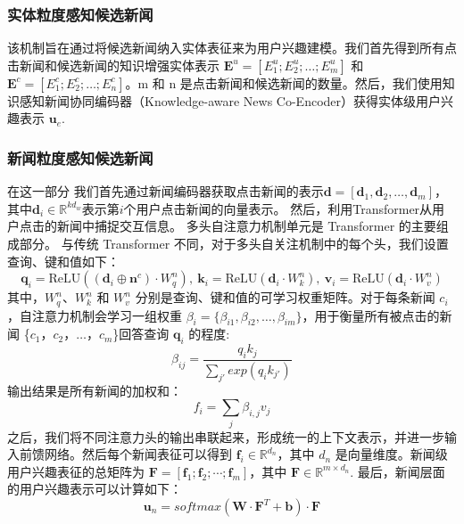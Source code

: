 \documentclass[withoutpreface,bwprint]{cumcmthesis} %
\begin{document}
	\subsubsection{ 实体粒度感知候选新闻}
	该机制旨在通过将候选新闻纳入实体表征来为用户兴趣建模。我们首先得到所有点击新闻和候选新闻的知识增强实体表示 $\mathbf{E}^{u} = [E^u_1;E^u_2;\dots;E^u_m] $ 和 $\mathbf{E}^{c} = [E^c_1;E^c_2;\dots;E^c_n] $。m 和 n 是点击新闻和候选新闻的数量。然后，我们使用知识感知新闻协同编码器（Knowledge-aware News Co-Encoder）获得实体级用户兴趣表示 $\mathbf{u}_e $.
	\subsubsection{ 新闻粒度感知候选新闻}
	在这一部分 
	我们首先通过新闻编码器获取点击新闻的表示$\mathbf{d}=[\mathbf{d}_1, \mathbf{d}_2,\dots,\mathbf{d}_m]$，其中$\mathbf{d}_i \in \mathbb{R}^{kd_w}$表示第$i$个用户点击新闻的向量表示。
	然后，利用Transformer从用户点击的新闻中捕捉交互信息。
	多头自注意力机制单元是 Transformer 的主要组成部分。
	与传统 Transformer 不同，对于多头自关注机制中的每个头，我们设置查询、键和值如下：
	\begin{equation}\label{eatt}
	\mathbf{q}_{i} = \mathrm{ReLU}((\mathbf{d}_i \oplus \mathbf{n}^c) \cdot W^n_q),~ \mathbf{k}_{i} = \mathrm{ReLU}(\mathbf{d}_i \cdot W^n_k),~
	\mathbf{v}_{i} = \mathrm{ReLU}(\mathbf{d}_i \cdot W^n_v)
	\end{equation}
	其中，$W^n_q$、$W^n_k$ 和 $W^n_v$ 分别是查询、键和值的可学习权重矩阵。对于每条新闻 $c_i$，自注意力机制会学习一组权重 $\beta_i = \{\beta_{i1}, \beta_{i2}, \dots, \beta_{im}\}$，用于衡量所有被点击的新闻 \{$c_1$，$c_2$，$\dots$，$c_m$\}回答查询 $\mathbf{q}_i$ 的程度:
	\begin{equation}
	\beta_{ij} = \frac{q_ik_j}{\sum_{j'}exp(q_ik_{j'})}
	\end{equation}
	输出结果是所有新闻的加权和：
	\begin{equation}
	f_i = \sum_j \beta_{i,j}v_j
	\end{equation}
	之后，我们将不同注意力头的输出串联起来，形成统一的上下文表示，并进一步输入前馈网络。然后每个新闻表征可以得到 $\mathbf{f}_i \in \mathbb{R}^{d_n}$，其中 $d_n$ 是向量维度。新闻级用户兴趣表征的总矩阵为 $\mathbf{F}=[\mathbf{f}_1; \mathbf{f}_2; \cdots; \mathbf{f}_m]$，其中 $\mathbf{F} \in \mathbb{R}^{m \times d_n}$.
	最后，新闻层面的用户兴趣表示可以计算如下：
	\begin{equation}
	\mathbf{u}_n = softmax( \mathbf{W} \cdot \mathbf{F}^{T} + \mathbf{b}) \cdot \mathbf{F}
	\end{equation}
\end{document}

